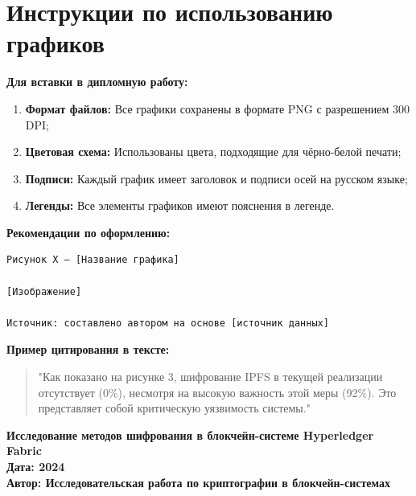 \documentclass[a4paper,14pt]{extreport}
\begin{document}
\section*{Инструкции по использованию графиков}

\textbf{Для вставки в дипломную работу:}
\begin{enumerate}
    \item \textbf{Формат файлов:} Все графики сохранены в формате PNG с разрешением 300 DPI;
    \item \textbf{Цветовая схема:} Использованы цвета, подходящие для чёрно-белой печати;
    \item \textbf{Подписи:} Каждый график имеет заголовок и подписи осей на русском языке;
    \item \textbf{Легенды:} Все элементы графиков имеют пояснения в легенде.
\end{enumerate}

\textbf{Рекомендации по оформлению:}
\begin{verbatim}
Рисунок X — [Название графика]

[Изображение]

Источник: составлено автором на основе [источник данных]
\end{verbatim}

\textbf{Пример цитирования в тексте:}
\begin{quote}
"Как показано на рисунке 3, шифрование IPFS в текущей реализации отсутствует (0\%), несмотря на высокую важность этой меры (92\%). Это представляет собой критическую уязвимость системы."
\end{quote}

\newpage

\begin{center}
    \Large\bfseries
    Исследование методов шифрования в блокчейн-системе Hyperledger Fabric\\
    \normalsize\mdseries
    Дата: 2024\\
    Автор: Исследовательская работа по криптографии в блокчейн-системах
\end{center}
\end{document}

